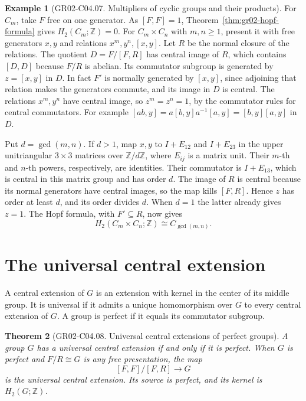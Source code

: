 \documentclass[11pt,oneside,openany]{book}
\newtheorem{theorem}{Theorem}[chapter]
\theoremstyle{definition}
\newtheorem{example}[theorem]{Example}
\theoremstyle{remark}
\begin{document}
\begin{example}[GR02-C04.07. Multipliers of cyclic groups and their products]
\label{ex:gr02-multiplier-cyclic-product}
For \(C_m\), take \(F\) free on one generator. As \([F,F]=1\),
Theorem~\ref{thm:gr02-hopf-formula} gives \(H_2(C_m;\mathbb Z)=0\).
For \(C_m\times C_n\) with \(m,n\geq 1\), present it with free
generators \(x,y\) and relations \(x^m,y^n,[x,y]\). Let \(R\)
be the normal closure of the relations. The quotient
\(D=F/[F,R]\) has central image of \(R\), which contains
\([D,D]\) because \(F/R\) is abelian. Its commutator subgroup is
generated by \(z=[x,y]\) in \(D\). In fact \(F'\) is normally
generated by \([x,y]\), since adjoining that relation makes
the generators commute, and its image in \(D\) is central.
The relations \(x^m,y^n\) have central image, so
\(z^m=z^n=1\), by the commutator rules for central commutators.
For example \([ab,y]=a[b,y]a^{-1}[a,y]=[b,y][a,y]\) in \(D\).

Put \(d=\gcd(m,n)\). If \(d>1\), map \(x,y\) to \(I+E_{12}\)
and \(I+E_{23}\) in the upper unitriangular \(3\times3\) matrices
over \(\mathbb Z/d\mathbb Z\), where \(E_{ij}\) is a matrix unit.
Their \(m\)-th and \(n\)-th powers, respectively, are identities.
Their commutator is \(I+E_{13}\), which is central in this matrix
group and has order \(d\). The image of \(R\) is central because
its normal generators have central images, so the map kills
\([F,R]\). Hence \(z\) has order at least \(d\), and its order
divides \(d\). When \(d=1\) the latter already gives \(z=1\).
The Hopf formula, with \(F'\subseteq R\), now gives
\[
          H_2(C_m\times C_n;\mathbb Z)\cong C_{\gcd(m,n)} .
\]
\end{example}

\section{The universal central extension}

A central extension of \(G\) is an extension with kernel
in the center of its middle group. It is universal if it
admits a unique homomorphism over \(G\) to every central
extension of \(G\). A group is perfect if it equals its
commutator subgroup.

\begin{theorem}[GR02-C04.08. Universal central extensions of perfect groups]
\label{thm:gr02-universal-central-extension}
A group \(G\) has a universal central extension if and only if
it is perfect. When \(G\) is perfect and \(F/R\cong G\) is any
free presentation, the map
\[
       [F,F]/[F,R]\longrightarrow G
\]
is the universal central extension. Its source is perfect,
and its kernel is \(H_2(G;\mathbb Z)\).
\end{theorem}
\end{document}
